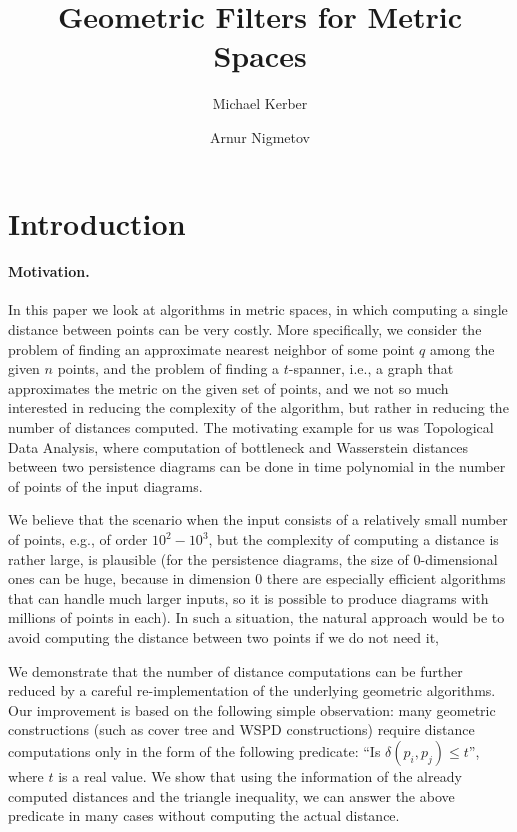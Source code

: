 \documentclass[a4paper,USenglish]{socg-lipics-v2018}
\title{Geometric Filters for Metric Spaces}
\author{Michael Kerber}{TU Graz}{kerber@tugraz.at}{}{}
\author{Arnur Nigmetov}{TU Graz}{nigmetov@tugraz.at}{}{}
\newcommand{\dist}{\delta}
\begin{document}
\maketitle

\section{Introduction}

\paragraph{Motivation.}

In this paper we look at algorithms in metric spaces,
in which computing a single distance between points can be very costly.
More specifically,
we consider the problem of finding an approximate nearest neighbor
of some point $q$ among the given $n$ points, and the problem of finding a $t$-spanner,
i.e., a graph that approximates the metric on the given set of points,
and we not so much interested in reducing the complexity of the algorithm,
but rather in reducing the number of distances computed.
The motivating example for us was Topological Data Analysis, where computation
of bottleneck and Wasserstein distances between two persistence diagrams
can be done in time polynomial in the number of points of the input diagrams.

We believe that the scenario when the input consists of a relatively small number of points, 
e.g., of order $10^2-10^3$, but the complexity of computing a distance is rather large,
is plausible (for the persistence diagrams, the size of 0-dimensional ones can be huge,
because in dimension 0 there are especially efficient algorithms that can handle much
larger inputs, so it is possible to produce diagrams with millions of  points in each).
In such a situation, the natural approach would be to avoid computing the
distance between two points if we do not need it,

We demonstrate that the number of distance computations can be further
reduced by a careful re-implementation of the underlying geometric algorithms.
Our improvement is based on the following simple observation: many geometric
constructions (such as cover tree and WSPD constructions) require distance
computations only in the form of the following predicate: 
``Is $\dist(p_i,p_j)\leq t$'', where $t$ is a real value.
We show that using the information of the already computed distances and
the triangle inequality, we can answer the above predicate in many cases
without computing the actual distance.
\end{document}

